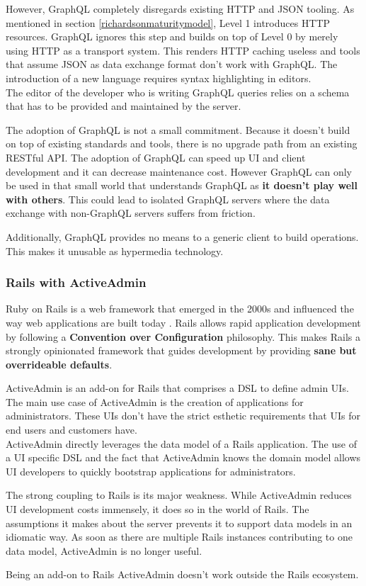 However, GraphQL completely disregards existing HTTP and JSON tooling. As mentioned in section \ref{richardsonmaturitymodel}, Level 1 introduces HTTP resources. GraphQL ignores this step and builds on top of Level 0 by merely using HTTP as a transport system. This renders HTTP caching useless and tools that assume JSON as data exchange format don't work with GraphQL. The introduction of a new language requires syntax highlighting in editors. \\
The editor of the developer who is writing GraphQL queries relies on a schema that has to be provided and maintained by the server.

The adoption of GraphQL is not a small commitment. Because it doesn't build on top of existing standards and tools, there is no upgrade path from an existing RESTful API. The adoption of GraphQL can speed up UI and client development and it can decrease maintenance cost. However GraphQL can only be used in that small world that understands GraphQL as \textbf{it doesn't play well with others}. This could lead to isolated GraphQL servers where the data exchange with non-GraphQL servers suffers from friction.

Additionally, GraphQL provides no means to a generic client to build operations. This makes it unusable as hypermedia technology.

\subsubsection{Rails with ActiveAdmin}
Ruby on Rails is a web framework that emerged in the 2000s and influenced the way web applications are built today \citep{rubyonrails}. Rails allows rapid application development by following a \textbf{Convention over Configuration} philosophy. This makes Rails a strongly opinionated framework that guides development by providing \textbf{sane but overrideable defaults}.

ActiveAdmin is an add-on for Rails that comprises a \gls{DSL} to define admin UIs. The main use case of ActiveAdmin is the creation of applications for administrators. These UIs don't have the strict esthetic requirements that UIs for end users and customers have. \\
ActiveAdmin directly leverages the data model of a Rails application. The use of a UI specific DSL and the fact that ActiveAdmin knows the domain model allows UI developers to quickly bootstrap applications for administrators.

The strong coupling to Rails is its major weakness. While ActiveAdmin reduces UI development costs immensely, it does so in the world of Rails. The assumptions it makes about the server prevents it to support data models in an idiomatic way. As soon as there are multiple Rails instances contributing to one data model, ActiveAdmin is no longer useful.

Being an add-on to Rails ActiveAdmin doesn't work outside the Rails ecosystem.
